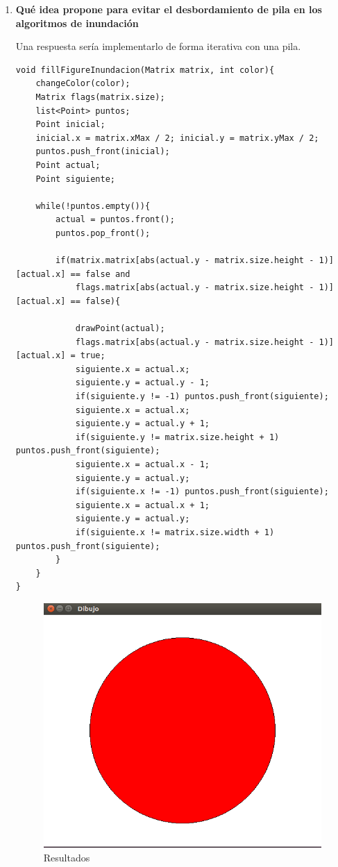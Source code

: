 \documentclass[a4paper,12pt]{article}
\begin{document}
\begin{enumerate}
  \item \textbf{Qué idea propone para evitar el desbordamiento de pila en los algoritmos de inundación}
 
 Una respuesta sería implementarlo de forma iterativa con una pila.
 
 \begin{lstlisting}
void fillFigureInundacion(Matrix matrix, int color){
    changeColor(color);
    Matrix flags(matrix.size);
    list<Point> puntos;
    Point inicial;
    inicial.x = matrix.xMax / 2; inicial.y = matrix.yMax / 2;
    puntos.push_front(inicial);
    Point actual;
    Point siguiente;
    
    while(!puntos.empty()){
        actual = puntos.front();
        puntos.pop_front();

        if(matrix.matrix[abs(actual.y - matrix.size.height - 1)][actual.x] == false and
            flags.matrix[abs(actual.y - matrix.size.height - 1)][actual.x] == false){

            drawPoint(actual);
            flags.matrix[abs(actual.y - matrix.size.height - 1)][actual.x] = true;
            siguiente.x = actual.x;
            siguiente.y = actual.y - 1;
            if(siguiente.y != -1) puntos.push_front(siguiente);
            siguiente.x = actual.x;
            siguiente.y = actual.y + 1;
            if(siguiente.y != matrix.size.height + 1) puntos.push_front(siguiente);
            siguiente.x = actual.x - 1;
            siguiente.y = actual.y;
            if(siguiente.x != -1) puntos.push_front(siguiente);
            siguiente.x = actual.x + 1;
            siguiente.y = actual.y;
            if(siguiente.x != matrix.size.width + 1) puntos.push_front(siguiente);
        }
    }
}
 \end{lstlisting}
 
  \begin{figure}[H]
   \centering
   \includegraphics[scale = 0.5]{1.png}
   \caption{Resultados}
  \end{figure}
  

\end{enumerate}
\end{document}
